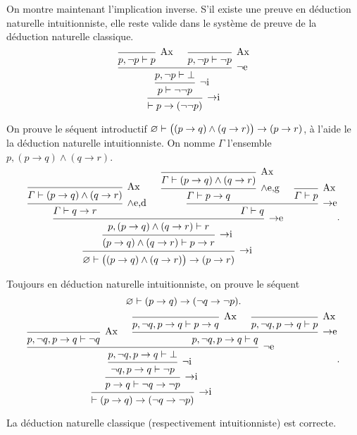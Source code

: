 \begin{exm}
	On montre maintenant l'implication inverse. S'il existe une preuve en déduction naturelle intuitionniste, elle reste valide dans le système de preuve de la déduction naturelle classique.
	\[
		\begin{prooftree}
			\infer 0[Ax]{p, \lnot p \vdash p}
			\infer 0[Ax]{p, \lnot p \vdash \lnot p}
			\infer 2[$\lnot$e]{p,\lnot p \vdash \bot} %
			\infer 1[$\lnot$i]{p \vdash \lnot \lnot p} %
			\infer 1[$\to$i]{\vdash p \to (\lnot \lnot  p)} %
		\end{prooftree}
	\]
\end{exm}

\begin{exm}
	On prouve le séquent introductif $\varnothing \vdash \big((p \to q) \land (q \to r)\big) \to (p \to r)$, à l'aide le la déduction naturelle intuitionniste.
	On nomme $\Gamma$\/ l'ensemble $p,(p\to q) \land (q \to r)$.
	\[
		\begin{prooftree}
			\infer 0[Ax]{\Gamma \vdash (p \to q) \land (q \to r)}
			\infer 1[$\land$e,d]{\Gamma \vdash q \to r} %
			\infer 0[Ax]{\Gamma \vdash (p \to q) \land (q \to r)}
			\infer 1[$\land$e,g]{\Gamma \vdash p \to q} %
			\infer 0[Ax]{\Gamma \vdash p}
			\infer 2[$\to$e]{\Gamma \vdash q} %
			\infer 2[$\to$e]{p,(p\to q) \land (q \to r) \vdash r} %
			\infer 1[$\to$i]{(p\to q) \land(q \to r) \vdash p \to r} %
			\infer 1[$\to$i]{\O \vdash \big((p \to q) \land (q \to r)\big) \to (p \to r)} %
		\end{prooftree}
	.\] 
\end{exm}

\begin{exm}
	Toujours en déduction naturelle intuitionniste, on prouve le séquent \[
		\varnothing \vdash (p \to q) \to (\lnot q \to \lnot p)
	.\]
	\[
		\begin{prooftree}
			\infer 0[Ax]{p,\lnot q,p\to q \vdash \lnot q}
			\infer 0[Ax]{p,\lnot q,p\to q \vdash p \to q}
			\infer 0[Ax]{p,\lnot q,p\to q \vdash p}
			\infer 2[$\to$e]{p,\lnot q,p\to q \vdash q} %
			\infer 2[$\lnot$e]{p,\lnot q,p\to q \vdash \bot} %
			\infer 1[$\lnot$i]{\lnot q, p \to q \vdash \lnot p}
			\infer 1[$\to$i]{p \to q \vdash \lnot q \to \lnot p}
			\infer 1[$\to$i]{\vdash (p \to q) \to (\lnot q \to \lnot p)}
		\end{prooftree}
	.\]
\end{exm}


\begin{thm}
	La déduction naturelle classique (respectivement intuitionniste) est correcte.
\end{thm}

